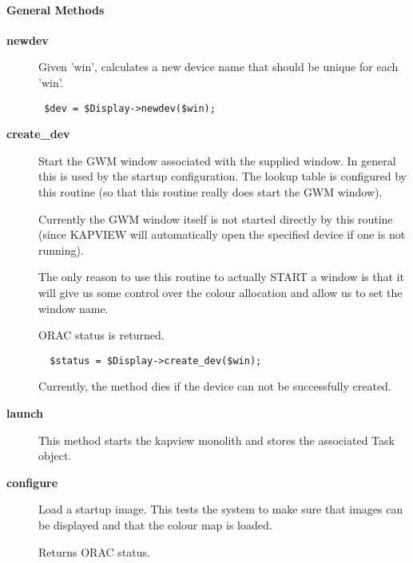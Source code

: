 \paragraph*{General Methods\label{ORAC::Display::KAPVIEW_General_Methods}}\begin{description}
\item[\textbf{newdev}] \mbox{}

Given 'win', calculates a new device name that should be unique for
each 'win'.

\begin{verbatim}
 $dev = $Display->newdev($win);
\end{verbatim}
\item[\textbf{create\_dev}] \mbox{}

Start the GWM window associated with the supplied window.
In general this is used by the startup configuration.
The lookup table is configured by this routine (so that
this routine really does start the GWM window).



Currently the GWM window itself is not started directly
by this routine (since KAPVIEW will automatically open
the specified device if one is not running).



The only reason to use this routine to actually START a window
is that it will give us some control over the colour allocation
and allow us to set the window name.



ORAC status is returned.

\begin{verbatim}
  $status = $Display->create_dev($win);
\end{verbatim}


Currently, the method dies if the device can not be successfully
created.

\item[\textbf{launch}] \mbox{}

This method starts the kapview monolith and stores the associated
Task object.

\item[\textbf{configure}] \mbox{}

Load a startup image. This tests the system to make sure that images
can be displayed and that the colour map is loaded.



Returns ORAC status.


\end{description}

